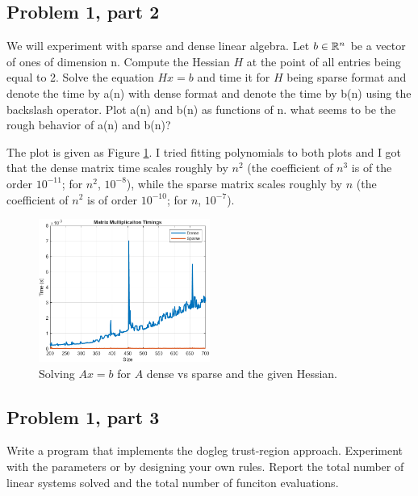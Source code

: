 \subsection{Problem 1, part 2}
We will experiment with sparse and dense linear algebra. Let $b \in \mathbb{R}^n$ be a vector of ones of dimension n. Compute the Hessian $H$ at the point of all entries being equal to 2. Solve the equation $Hx = b$ and time it for $H$ being sparse format and denote the time by a(n) with dense format and denote the time by b(n) using the backslash operator. Plot a(n) and b(n) as functions of n. what seems to be the rough behavior of a(n) and b(n)? 
\partbreak
\begin{solution}

    The plot is given as Figure \ref{fig:MatMult}. I tried fitting polynomials to both plots and I got that the dense matrix time scales roughly by $n^2$ (the coefficient of $n^3$ is of the order $10^{-11}$; for $n^2$, $10^{-8}$), while the sparse matrix scales roughly by $n$ (the coefficient of $n^2$ is of order $10^{-10}$; for $n$, $10^{-7}$). 
\end{solution}
\vspace{4cm}
\begin{figure}[!h]
    \centering
    \includegraphics[width = 0.5\textwidth]{Plots/MatrixMultiplicationTimings.png}
    \caption{Solving $Ax = b$ for $A$ dense vs sparse and the given Hessian.}
    \label{fig:MatMult}
\end{figure}

\newpage
\subsection{Problem 1, part 3}
Write a program that implements the dogleg trust-region approach. Experiment with the parameters or by designing your own rules. Report the total number of linear systems solved and the total number of funciton evaluations.

\newpage
